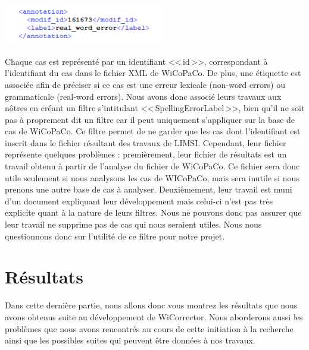 \documentclass[11pt]{article}
\begin{document}
\begin{center}
\includegraphics[width=7cm]{exemple16.png} %
\end{center}

Chaque cas est repr\'{e}sent\'{e} par un identifiant <<\,id\,>>, correspondant \`{a} l'identifiant du cas dans le fichier XML de WiCoPaCo. De plus, une \'{e}tiquette est associ\'{e}e afin de pr\'{e}ciser si ce cas est une erreur lexicale (non-word errors) ou grammaticale (real-word errors). Nous avons donc associ\'{e} leurs travaux aux n\^{o}tres en cr\'{e}ant un filtre s'intitulant <<\,SpellingErrorLabel\,>>, bien qu'il ne soit pas \`{a} proprement dit un filtre car il peut uniquement s'appliquer sur la base de cas de WiCoPaCo. Ce filtre permet de ne garder que les cas dont l'identifiant est inscrit dans le fichier r\'{e}sultant des travaux de LIMSI.
\newline
\newline
Cependant, leur fichier repr\'{e}sente quelques probl\`{e}mes : premi\`{e}rement, leur fichier de r\'{e}sultats est un travail obtenu \`{a} partir de l'analyse du fichier de WiCoPaCo. Ce fichier sera donc utile seulement si nous analysons les cas de WICoPaCo, mais sera inutile si nous prenons une autre base de cas \`{a} analyser. Deuxi\`{e}mement, leur travail est muni d'un document expliquant leur d\'{e}veloppement mais celui-ci n'est pas tr\`{e}s explicite quant \`{a} la nature de leurs filtres. Nous ne pouvons donc pas assurer que leur travail ne supprime pas de cas qui nous seraient utiles. Nous nous questionnons donc sur l'utilit\'{e} de ce filtre pour notre projet.
\newline
\newline

\section{R\'{e}sultats}

Dans cette derni\`{e}re partie, nous allons donc vous montrez les r\'{e}sultats que nous avons obtenus suite au d\'{e}veloppement de WiCorrector. Nous aborderons aussi les probl\`{e}mes que nous avons rencontr\'{e}s au cours de cette initiation \`{a} la recherche ainsi que les possibles suites qui peuvent \^{e}tre donn\'{e}es \`{a} nos travaux.
\end{document}
